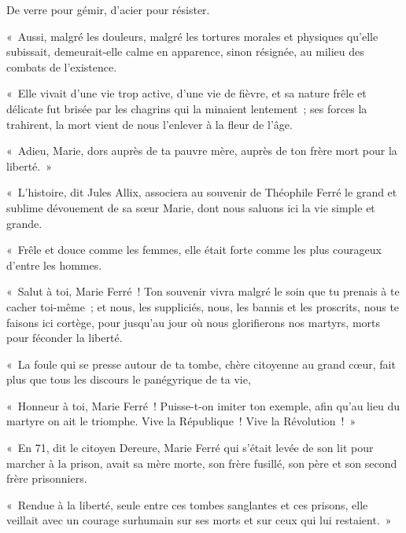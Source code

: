 \documentclass[french,twoside]{book} %
\newcommand{\astertri}{\medskip\par\centerline{\color{rubric}\large\selectfont{\syms ✻\,✻\,✻}}\medskip\par}%
\newenvironment{quoteblock}%
  {\begin{quoting}}
  {\end{quoting}}
\newenvironment{quotebar}{%
    \def\FrameCommand{{\color{rubric!10!}\vrule width 0.5em} \hspace{0.9em}}%
    \def\OuterFrameSep{\itemsep} %
    \MakeFramed {\advance\hsize-\width \FrameRestore}
  }%
  {%
    \endMakeFramed
  }
\renewenvironment{quoteblock}%
  {%
    \savenotes
    \setstretch{0.9}
    \normalfont
    \begin{quotebar}
  }
  {%
    \end{quotebar}
    \spewnotes
  }
\begin{document}
\begin{quoteblock}
\begin{quoteblock}
 \noindent De verre pour gémir, d’acier pour résister.
 \end{quoteblock}

 \noindent « Aussi, malgré les douleurs, malgré les tortures morales et physiques qu’elle subissait, demeurait-elle calme en apparence, sinon résignée, au milieu des combats de l’existence.\par
 « Elle vivait d’une vie trop active, d’une vie de fièvre, et sa nature frêle et délicate fut brisée par les chagrins qui la minaient  lentement ; ses forces la trahirent, la mort vient de nous l’enlever à la fleur de l’âge.\par
 « Adieu, Marie, dors auprès de ta pauvre mère, auprès de ton frère mort pour la liberté. »\par
 
\astertri

 \noindent « L’histoire, dit Jules Allix, associera au souvenir de Théophile Ferré le grand et sublime dévouement de sa sœur Marie, dont nous saluons ici la vie simple et grande.\par
 « Frêle et douce comme les femmes, elle était forte comme les plus courageux d’entre les hommes.\par
 « Salut à toi, Marie Ferré ! Ton souvenir vivra malgré le soin que tu prenais à te cacher toi-même ; et nous, les suppliciés, nous, les bannis et les proscrits, nous te faisons ici cortège, pour jusqu’au jour où nous glorifierons nos martyrs, morts pour féconder la liberté.\par
 « La foule qui se presse autour de ta tombe, chère citoyenne au grand cœur, fait plus que tous les discours le panégyrique de ta vie,\par
 « Honneur à toi, Marie Ferré ! Puisse-t-on imiter ton exemple, afin qu’au lieu du martyre on ait le triomphe. Vive la République ! Vive la Révolution ! »\par
 
\astertri

 \noindent « En 71, dit le citoyen Dereure, Marie Ferré qui s’était levée de son lit pour marcher à la prison, avait sa mère morte, son frère fusillé, son père et son second frère prisonniers.\par
 « Rendue à la liberté, seule entre ces tombes sanglantes et ces prisons, elle veillait avec un courage surhumain sur ses morts et sur ceux qui lui restaient. »
 \end{quoteblock}
\end{document}
